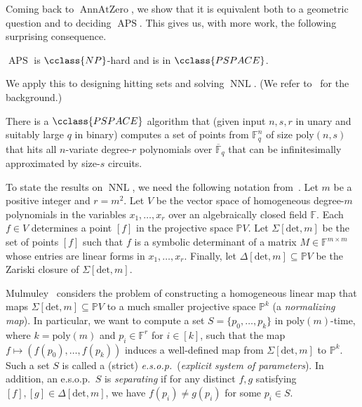 \documentclass{toc}
\newcommand{\F}{\mathbb{F}}
\newcommand{\proj}{\mathbb{P}}
\newcommand{\ol}[1]{\overline{#1}}
\newcommand{\NP}{\cclass{NP}\xspace}  %
\newcommand{\PSPACE}{\cclass{PSPACE}\xspace}  %
\DeclareMathOperator{\APS}{\mathrm{APS}\xspace} %
\DeclareMathOperator{\AnnAtZero}{\mathrm{AnnAtZero}\xspace} %
\DeclareMathOperator{\NNL}{\mathrm{NNL}\xspace} %
\begin{document}
Coming back to $\AnnAtZero$, we show that it is equivalent both to a geometric question and to deciding $\APS$. This gives us, with more work, the following surprising consequence.

\begin{theorem}\label{thm-aps}
 $\APS$ is $\NP$-hard and is in $\PSPACE$.
\end{theorem}

We apply this to designing hitting sets and solving
%
$\NNL$.  (We refer to~\cite{mulmuley2017geometric} for the background.)

\begin{theorem}\label{thm-hsg}
  There is a $\PSPACE$ algorithm that 
  (given input $n,s,r$ in unary
%
and  %
suitably large $q$ in binary)
%
computes  %
a set of points from $\F_q ^n$ of size 
%
$\mathrm{poly}(n,s)$ %
%
that hits all $n$-variate degree-$r$ polynomials over $\ol{\F}_q $ that can be infinitesimally approximated by
%
size-$s$     %
circuits.
\end{theorem}
%

To state the results on $\NNL$, we need the following
%
notation    %
from~\cite{mulmuley2017geometric}. %
Let $m$ be a positive integer and $r=m^2$.   Let $V$ be the vector space of homogeneous degree-$m$ polynomials in the variables $x_1,\dots, x_{r}$ over an algebraically closed field $\F$. 
Each $f\in V$ determines a point $[f]$ in the projective space $\proj V$.
Let $\Sigma[\mathrm{det}, m]$ be the set of points $[f]$  such that $f$ is a symbolic determinant of a matrix $M\in \mathbb{F}^{m\times m}$ whose entries are linear forms in $x_1,\dots,x_r$. 
Finally, let $\Delta[\mathrm{det}, m]\subseteq \proj V$ be the
%
Zariski   %
closure of $\Sigma[\mathrm{det}, m]$. 

%
Mulmuley~\cite{mulmuley2017geometric} considers the problem of constructing a homogeneous linear map that maps $\Sigma[\mathrm{det}, m]\subseteq\proj V$ to a much smaller projective space $\proj^k$ (a \emph{normalizing map}). In particular, we want to compute a set $S=\{p_0,\dots,p_k\}$ in $\mathrm{poly}(m)$-time, where $k= \mathrm{poly}(m)$ and $p_i\in \F^r$ for $i\in [k]$, such that the map $f\mapsto (f(p_0),\dots,f(p_k))$ induces a
%
well-defined    %
map from $\Sigma[\mathrm{det}, m]$ to $\proj^k$. Such a set $S$ is called a (strict) \emph{e.s.o.p.}\ (\emph{explicit system of parameters}). In addition, an e.s.o.p.\ $S$ is \emph{separating} if for any distinct $f,g$
%
%
satisfying $[f], [g]\in \Delta[\mathrm{det}, m]$,
we have $f(p_i)\neq g(p_i)$ for some $p_i\in S$.
\end{document}
